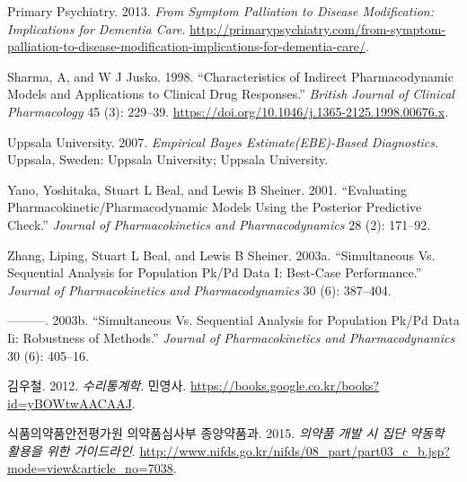 \documentclass[
  10pt,
  krantz2,
  a4paper]{krantz}
\newlength{\cslhangindent}
\newenvironment{cslreferences}%
  {\setlength{\parindent}{0pt}%
  \everypar{\setlength{\hangindent}{\cslhangindent}}\ignorespaces}%
  {\par}
\theoremstyle{definition}
\theoremstyle{definition}
\theoremstyle{definition}
\theoremstyle{remark}
\begin{document}
\begin{cslreferences}
\leavevmode\hypertarget{ref-dementia}{}%
Primary Psychiatry. 2013. \emph{From Symptom Palliation to Disease Modification: Implications for Dementia Care}. \url{http://primarypsychiatry.com/from-symptom-palliation-to-disease-modification-implications-for-dementia-care/}.

\leavevmode\hypertarget{ref-sharma1998characteristics}{}%
Sharma, A, and W J Jusko. 1998. ``Characteristics of Indirect Pharmacodynamic Models and Applications to Clinical Drug Responses.'' \emph{British Journal of Clinical Pharmacology} 45 (3): 229--39. \url{https://doi.org/10.1046/j.1365-2125.1998.00676.x}.

\leavevmode\hypertarget{ref-uppsala}{}%
Uppsala University. 2007. \emph{Empirical Bayes Estimate(EBE)-Based Diagnostics}. Uppsala, Sweden: Uppsala University; Uppsala University.

\leavevmode\hypertarget{ref-yano2001evaluating}{}%
Yano, Yoshitaka, Stuart L Beal, and Lewis B Sheiner. 2001. ``Evaluating Pharmacokinetic/Pharmacodynamic Models Using the Posterior Predictive Check.'' \emph{Journal of Pharmacokinetics and Pharmacodynamics} 28 (2): 171--92.

\leavevmode\hypertarget{ref-zhang1}{}%
Zhang, Liping, Stuart L Beal, and Lewis B Sheiner. 2003a. ``Simultaneous Vs. Sequential Analysis for Population Pk/Pd Data I: Best-Case Performance.'' \emph{Journal of Pharmacokinetics and Pharmacodynamics} 30 (6): 387--404.

\leavevmode\hypertarget{ref-zhang2}{}%
---------. 2003b. ``Simultaneous Vs. Sequential Analysis for Population Pk/Pd Data Ii: Robustness of Methods.'' \emph{Journal of Pharmacokinetics and Pharmacodynamics} 30 (6): 405--16.

\leavevmode\hypertarget{ref-kim}{}%
김우철. 2012. \emph{수리통계학}. 민영사. \url{https://books.google.co.kr/books?id=yBOWtwAACAAJ}.

\leavevmode\hypertarget{ref-poppk}{}%
식품의약품안전평가원 의약품심사부 종양약품과. 2015. \emph{의약품 개발 시 집단 약동학 활용을 위한 가이드라인}. \url{http://www.nifds.go.kr/nifds/08_part/part03_c_b.jsp?mode=view\&article_no=7038}.
\end{cslreferences}

\printindex
\end{document}
